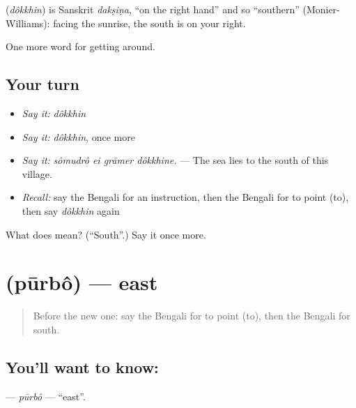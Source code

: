 \begin{cousinweb}
\textbf{} (\emph{dôkkhin}) is Sanskrit \emph{dakṣiṇa}, \textquotedblleft{}on the right hand\textquotedblright{} and so \textquotedblleft{}southern\textquotedblright{} (Monier-Williams): facing the sunrise, the south is on your right.
\end{cousinweb}

\begin{grammarlens}[title={What you've built}]
One more word for getting around.
\end{grammarlens}

\subsection*{Your turn}
\begin{itemize}
\raggedright
  \item \emph{Say it:} \emph{dôkkhin}
  \item \emph{Say it:} \emph{dôkkhin}, once more
  \item \emph{Say it:} \emph{sômudrô ei grāmer dôkkhine.} — The sea lies to the south of this village.
  \item \emph{Recall:} say the Bengali for an instruction, then the Bengali for to point (to), then say \emph{dôkkhin} again
\end{itemize}

\begin{tcolorbox}[breakable,colback=teal!4,colframe=teal!35!black,title={Before you move on}]
What does  mean? (\textquotedblleft{}South\textquotedblright{}.) Say it once more.
\end{tcolorbox}
\section[\texorpdfstring{\bn{পূর্ব} (pūrbô)}{পূর্ব (pūrbô)}]{ (pūrbô) — east}

\label{lesson:BN-C401-purbo}



\begin{quote}
Before the new one: say the Bengali for to point (to), then the Bengali for south.
\end{quote}

\subsection*{You'll want to know: }
\textbf{} — \emph{pūrbô} — \textquotedblleft{}east\textquotedblright{}.

